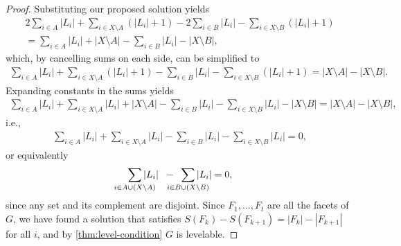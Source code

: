 \begin{proof}
Substituting our proposed solution yields
\begin{equation*}
\begin{aligned}
2 \sum_{i \in A} |L_i| + \sum_{i \in X\setminus A} (|L_i| + 1)  - 2 \sum_{i \in B} |L_i| - \sum_{i \in X \setminus B} (|L_i| + 1) \\
= \sum_{i \in A} |L_i| + |X \setminus A| - \sum_{i \in B} |L_i| - |X \setminus B|,
\end{aligned}
\end{equation*}
which, by cancelling sums on each side, can be simplified to 
\begin{equation*}
\begin{aligned}
 \sum_{i \in A} |L_i|  +  \sum_{i \in X\setminus A} (|L_i| + 1) - \sum_{i \in B} |L_i| -  \sum_{i \in X \setminus B} (|L_i| + 1) 
= |X \setminus A| - |X \setminus B|.
\end{aligned}
\end{equation*}
Expanding constants in the sums yields
\begin{equation*}
\begin{aligned}
 \sum_{i \in A} |L_i|  +  \sum_{i \in X\setminus A} |L_i|  + |X \setminus A| - \sum_{i \in B} |L_i| -  \sum_{i \in X \setminus B} |L_i| - |X \setminus B|
= |X \setminus A| - |X \setminus B|,
\end{aligned}
\end{equation*}
i.e.,
\begin{equation*}
\begin{aligned}
 \sum_{i \in A} |L_i|  +  \sum_{i \in X\setminus A} |L_i|  - \sum_{i \in B} |L_i| -  \sum_{i \in X \setminus B} |L_i| = 0,
\end{aligned}
\end{equation*}
or equivalently
\begin{equation*}
\begin{aligned}
 \smashoperator{ \sum_{i \in A \cup (X \setminus A)}} |L_i|  \; \; - \; \; \smashoperator{\sum_{i \in B \cup (X \setminus B)}} |L_i|= 0,
\end{aligned}
\end{equation*}
since any set and its complement are disjoint. Since $F_1, \dots, F_t$ are all the facets of $G$, we have found a solution that satisfies $S(F_k) - S(F_{k+1}) = |F_k| - |F_{k+1}|$ for all $i$, and by \autoref{thm:level-condition} $G$ is levelable.
\end{proof}

